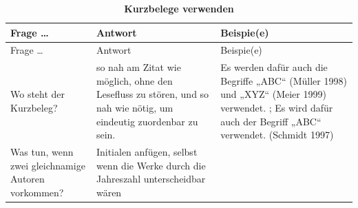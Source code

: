 \documentclass[]{book}
\theoremstyle{definition}
\theoremstyle{definition}
\theoremstyle{definition}
\theoremstyle{remark}
\begin{document}
\begin{longtable}[]{@{}lll@{}}
\caption{\textbf{\label{tab:zitieren3} Kurzbelege verwenden}}\tabularnewline
\toprule
\begin{minipage}[b]{0.18\columnwidth}\raggedright\strut
Frage \ldots{}\strut
\end{minipage} & \begin{minipage}[b]{0.37\columnwidth}\raggedright\strut
Antwort\strut
\end{minipage} & \begin{minipage}[b]{0.36\columnwidth}\raggedright\strut
Beispie(e)\strut
\end{minipage}\tabularnewline
\midrule
\endfirsthead
\toprule
\begin{minipage}[b]{0.18\columnwidth}\raggedright\strut
Frage \ldots{}\strut
\end{minipage} & \begin{minipage}[b]{0.37\columnwidth}\raggedright\strut
Antwort\strut
\end{minipage} & \begin{minipage}[b]{0.36\columnwidth}\raggedright\strut
Beispie(e)\strut
\end{minipage}\tabularnewline
\midrule
\endhead
\begin{minipage}[t]{0.18\columnwidth}\raggedright\strut
Wo steht der Kurzbeleg?\strut
\end{minipage} & \begin{minipage}[t]{0.37\columnwidth}\raggedright\strut
so nah am Zitat wie möglich, ohne den Lesefluss zu stören, und so nah
wie nötig, um eindeutig zuordenbar zu sein.\strut
\end{minipage} & \begin{minipage}[t]{0.36\columnwidth}\raggedright\strut
Es werden dafür auch die Begriffe „ABC`` (Müller 1998) und „XYZ`` (Meier
1999) verwendet. ; Es wird dafür auch der Begriff „ABC`` verwendet.
(Schmidt 1997) \vspace{-6mm}\strut
\end{minipage}\tabularnewline
\begin{minipage}[t]{0.18\columnwidth}\raggedright\strut
Was tun, wenn zwei gleichnamige Autoren vorkommen?\strut
\end{minipage} & \begin{minipage}[t]{0.37\columnwidth}\raggedright\strut
Initialen anfügen, selbst wenn die Werke durch die Jahreszahl
unterscheidbar wären\strut
\end{minipage} & \begin{minipage}[t]{0.36\columnwidth}\raggedright\strut

\end{minipage}
\end{longtable}
\end{document}
